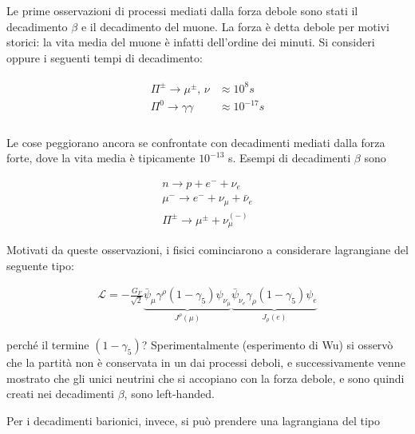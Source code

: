 \documentclass[11pt]{report}
\begin{document}
Le prime osservazioni di processi mediati dalla forza debole sono stati il decadimento \(\beta\) e il decadimento del muone. La forza è detta debole per motivi storici: la vita media del muone è infatti dell'ordine dei minuti. Si consideri oppure i seguenti tempi di decadimento: 

\begin{align}
\begin{matrix}
    \Pi^\pm \rightarrow \mu^\pm, \, \nu & \approx 10^8 s \\ 
    \Pi^0 \rightarrow \gamma\gamma & \approx 10^{-17}s \\
\end{matrix}
\end{align}

Le cose peggiorano ancora se confrontate con decadimenti mediati dalla forza forte, dove la vita media è tipicamente \(10^{-13}\) s. Esempi di decadimenti \(\beta\) sono 

\begin{align}
    n \rightarrow p + e^- + \nu_e \\ 
    \mu^- \rightarrow e^- + \nu_\mu + \bar{\nu}_e \\ 
    \Pi^\pm \rightarrow \mu^\pm + \nu_\mu^{(-)}
\end{align}


Motivati da queste osservazioni, i fisici cominciarono a considerare lagrangiane del seguente tipo: 

\begin{align}
    \mathcal{L} = -\frac{G_F}{\sqrt{2}}\underbrace{\bar{\psi}_\mu \gamma^\rho (1-\gamma_5)\psi_{\nu_\mu}}_{J^\rho(\mu)} \underbrace{\bar{\psi}_{\nu_e}\gamma_\rho (1-\gamma_5)\psi_e}_{J_\rho (e)}
\end{align}

perché il termine \((1-\gamma_5)\)? Sperimentalmente (esperimento di Wu) si osservò che la partità non è conservata in un dai processi deboli, e successivamente venne mostrato che gli unici neutrini che si accopiano con la forza debole, e sono quindi creati nei decadimenti \(\beta\), sono left-handed. 

Per i decadimenti barionici, invece, si può prendere una lagrangiana del tipo 
\end{document}
